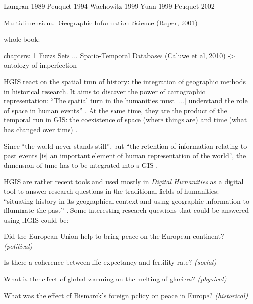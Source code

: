 
Langran 1989
Peuquet 1994
Wachowitz 1999
Yuan 1999
Peuquet 2002


Multidimensional Geographic Information Science (Raper, 2001)
\cite{raper2000multidimensional}

whole book:
\cite{Langran1989timeingis}

chapters:
1 Fuzzs Sets ...
Spatio-Temporal Databases (Caluwe et al, 2010)
-> ontology of imperfection
\cite{deCaluwe:2010:SDF:1965517}


HGIS react on the spatial turn of history: the integration of geographic methods in historical research. It aims to discover the power of cartographic representation: ``The spatial turn in the humanities must [...] understand the role of space in human events''
\cite{bodenhamer2010spatial}.
At the same time, they are the product of the temporal run in GIS: the coexistence of space (where things are) and time (what has changed over time)
\cite[p. 45]{solana2014spatio}.

Since ``the world never stands still'', but ``the retention of information relating to past events [is] an important element of human representation of the world'', the dimension of time has to be integrated into a GIS
\cite{peuquet99}.

HGIS are rather recent tools and used mostly in \emph{Digital Humanities} as a digital tool to answer research questions in the traditional fields of humanities: ``situating history in its geographical context and using geographic information to illuminate the past''
\cite[p. 3]{knowles2008placing}.
Some interesting research questions that could be answered using HGIS could be:

\begin{compactitem}
  \item Did the European Union help to bring peace on the European continent?
  \hfill \emph{(political)}
  \item Is there a coherence between life expectancy and fertility rate?
  \hfill \emph{(social)}
  \item What is the effect of global warming on the melting of glaciers?
  \hfill \emph{(physical)}
  \item What was the effect of Bismarck's foreign policy on peace in Europe?
  \hfill \emph{(historical)}
\end{compactitem}


